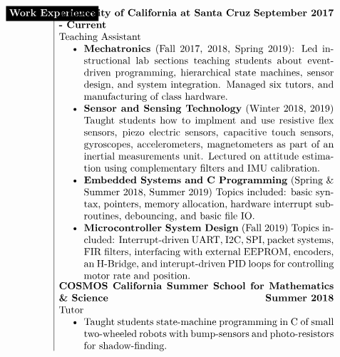 \documentclass[paper=a4,fontsize=10pt]{article} %
\def \mainColWidth {0.8\textwidth}		%
\def \leftColWidth {0.125\textwidth}		%
\begin{document}
\begin{align*}
	\begin{array}[t]{l} 
	\parbox[t]{\leftColWidth}{%
		\colorbox{black}{\color{white}{\textbf{Work Experience}}}
	}%
	\end{array}
	&
	\begin{array}[t]{|l}
		\parbox[t]{\mainColWidth}{%
			\textbf{University of California at Santa Cruz} \hfill \textbf{September 2017 - Current}\\
			\quad Teaching Assistant
			\begin{itemize}[noitemsep,topsep=0pt]
			\item \textbf{Mechatronics} (Fall 2017, 2018, Spring 2019): Led instructional lab sections teaching students about event-driven programming, hierarchical state machines, sensor design, and system integration. Managed six tutors, and manufacturing of class hardware.
			\item \textbf{Sensor and Sensing Technology} (Winter 2018, 2019) Taught students how to implment and use resistive flex sensors, piezo electric sensors, capacitive touch sensors, gyroscopes, accelerometers, magnetometers as part of an inertial measurements unit. Lectured on attitude estimation using complementary filters and IMU calibration.
			\item \textbf{Embedded Systems and C Programming} (Spring \& Summer 2018, Summer 2019) Topics included: basic syntax, pointers, memory allocation, hardware interrupt sub-routines, debouncing, and basic file IO.
			\item \textbf{Microcontroller System Design} (Fall 2019) Topics included: Interrupt-driven UART, I2C, SPI, packet systems, FIR filters, interfacing with external EEPROM, encoders, an H-Bridge, and interupt-driven PID loops for controlling motor rate and position. 
			\end{itemize}
		}%
		\\
		\parbox[t]{\mainColWidth}{%
			\textbf{COSMOS California Summer School for Mathematics \& Science}  \hfill \textbf{Summer 2018}\\
			\quad Tutor
			\begin{itemize}[noitemsep,topsep=0pt]
			\item Taught students state-machine programming in C of small two-wheeled robots with bump-sensors and photo-resistors for shadow-finding.
			\end{itemize}
}
\end{array}
\end{align*}
\end{document}
